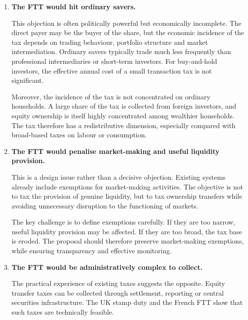 \documentclass[../main]{subfiles}
\begin{document}
\begin{enumerate}
    The main remaining issue is substitution towards untaxed instruments or arrangements, including derivatives. This is a valid concern. However, the proposal examined here is deliberately conservative and focuses on the most robust part of the tax base: equity ownership transfers. Additional anti-avoidance rules could be considered if substitution became significant, but the existence of possible avoidance margins is not a reason to abandon the tax altogether.

    \item \textbf{The FTT would hit ordinary savers.}

    This objection is often politically powerful but economically incomplete. The direct payer may be the buyer of the share, but the economic incidence of the tax depends on trading behaviour, portfolio structure and market intermediation. Ordinary savers typically trade much less frequently than professional intermediaries or short-term investors. For buy-and-hold investors, the effective annual cost of a small transaction tax is not significant.

    Moreover, the incidence of the tax is not concentrated on ordinary households. A large share of the tax is collected from foreign investors, and equity ownership is itself highly concentrated among wealthier households. The tax therefore has a redistributive dimension, especially compared with broad-based taxes on labour or consumption.

    \item \textbf{The FTT would penalise market-making and useful liquidity provision.}

    This is a design issue rather than a decisive objection. Existing systems already include exemptions for market-making activities. The objective is not to tax the provision of genuine liquidity, but to tax ownership transfers while avoiding unnecessary disruption to the functioning of markets.

    The key challenge is to define exemptions carefully. If they are too narrow, useful liquidity provision may be affected. If they are too broad, the tax base is eroded. The proposal should therefore preserve market-making exemptions, while ensuring transparency and effective monitoring.

    \item \textbf{The FTT would be administratively complex to collect.}

    The practical experience of existing taxes suggests the opposite. Equity transfer taxes can be collected through settlement, reporting or central securities infrastructure. The UK stamp duty and the French FTT show that such taxes are technically feasible.


\end{enumerate}
\end{document}

